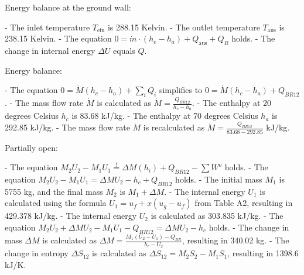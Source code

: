 Energy balance at the ground wall:

- The inlet temperature \( T_{\text{ein}} \) is 288.15 Kelvin.
- The outlet temperature \( T_{\text{aus}} \) is 238.15 Kelvin.
- The equation \( 0 = \dot{m} \cdot (h_e - h_a) + Q_{\text{aus}} + Q_R \) holds.
- The change in internal energy \( \Delta U \) equals \( Q \).

Energy balance:

- The equation \( 0 = \dot{M} (h_c - h_a) + \sum_i Q_{i} \) simplifies to \( 0 = \dot{M} (h_c - h_a) + Q_{BR12} \).
- The mass flow rate \( \dot{M} \) is calculated as \( \dot{M} = \frac{Q_{BR12}}{h_c - h_a} \).
- The enthalpy at 20 degrees Celsius \( h_c \) is 83.68 kJ/kg.
- The enthalpy at 70 degrees Celsius \( h_a \) is 292.85 kJ/kg.
- The mass flow rate \( \dot{M} \) is recalculated as \( \dot{M} = \frac{Q_{BR12}}{83.68 - 292.85} \) kJ/kg.

Partially open:

- The equation \( M_2 U_2 - M_1 U_1 \stackrel{!}{=} \Delta M (h_i) + Q_{BR12} - \sum W^o \) holds.
- The equation \( M_2 U_2 - M_1 U_1 = \Delta M U_2 - h_c + Q_{BR12} \) holds.
- The initial mass \( M_1 \) is 5755 kg, and the final mass \( M_2 \) is \( M_1 + \Delta M \).
- The internal energy \( U_1 \) is calculated using the formula \( U_1 = u_f + x (u_g - u_f) \) from Table A2, resulting in 429.378 kJ/kg.
- The internal energy \( U_2 \) is calculated as 303.835 kJ/kg.
- The equation \( M_2 U_2 + \Delta M U_2 - M_1 U_1 - Q_{BR12} = \Delta M U_2 - h_c \) holds.
- The change in mass \( \Delta M \) is calculated as \( \Delta M = \frac{M_1 (U_2 - U_1) - Q_{BR}}{h_c - U_2} \), resulting in 340.02 kg.
- The change in entropy \( \Delta S_{12} \) is calculated as \( \Delta S_{12} = M_2 S_2 - M_1 S_1 \), resulting in 1398.6 kJ/K.